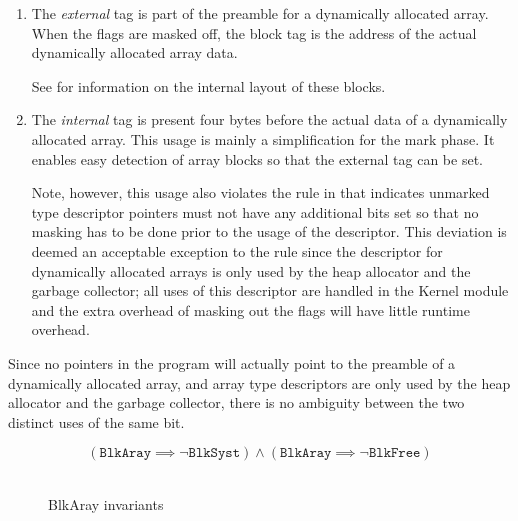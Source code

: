 \begin{enumerate}
\item The \emph{external} tag is part of the preamble for a
  dynamically allocated array.  When the flags are masked off, the
  block tag is the address of the actual dynamically allocated array
  data.

  See  for information on the internal layout
  of these blocks.


\item The \emph{internal} tag is present four bytes before the actual
  data of a dynamically allocated array.  This usage is mainly a
  simplification for the mark phase.  It enables easy detection of
  array blocks so that the external tag can be set.

  Note, however, this usage also violates the rule in
   that indicates unmarked type
  descriptor pointers must not have any additional bits set so that no
  masking has to be done prior to the usage of the descriptor.  This
  deviation is deemed an acceptable exception to the rule since the
  descriptor for dynamically allocated arrays is only used by the heap
  allocator and the garbage collector; all uses of this descriptor are
  handled in the Kernel module and the extra overhead of masking out
  the flags will have little runtime overhead.

\end{enumerate}

Since no pointers in the program will actually point to the preamble
of a dynamically allocated array, and array type descriptors are only
used by the heap allocator and the garbage collector, there is no
ambiguity between the two distinct uses of the same bit.

\begin{figure}[h]
    $$(\texttt{BlkAray} \implies \neg \texttt{BlkSyst}) \wedge
    (\texttt{BlkAray} \implies \neg \texttt{BlkFree})$$ \\
  \caption{BlkAray invariants}
  \label{memlay:blkaray-invariants}
\end{figure}
